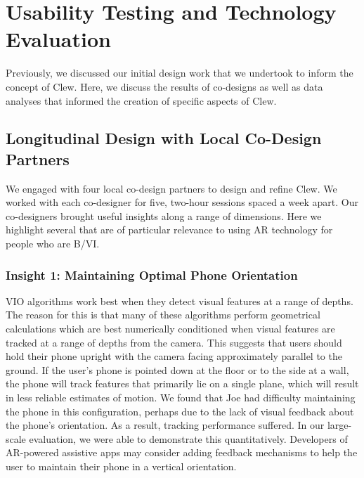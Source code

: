 \documentclass[chi_draft]{sigchi}
\newcommand{\BVI}{B/VI\xspace}
\begin{document}
\section{Usability Testing and Technology Evaluation}\label{sec:usabilityandevaluation}
Previously, we discussed our initial design work that we undertook to inform the concept of Clew.  Here, we discuss the results of co-designs as well as data analyses that informed the creation of specific aspects of Clew. %

\subsection{Longitudinal Design with Local Co-Design Partners}
We engaged with four local co-design partners to design and refine Clew.  We worked with each co-designer for five, two-hour sessions spaced a week apart.  Our co-designers brought useful insights along a range of dimensions.  Here we highlight several that are of particular relevance to using AR technology for people who are \BVI.

\subsubsection{Insight 1: Maintaining Optimal Phone Orientation}
VIO algorithms work best when they detect visual features at a range of depths.  The reason for this is that many of these algorithms perform geometrical calculations which are best numerically conditioned when visual features are tracked at a range of depths from the camera.  This suggests that users should hold their phone upright with the camera facing approximately parallel to the ground.  If the user's phone is pointed down at the floor or to the side at a wall, the phone will track features that primarily lie on a single plane, which will result in less reliable estimates of motion.  We found that Joe had difficulty maintaining the phone in this configuration, perhaps due to the lack of visual feedback about the phone's orientation.  As a result, tracking performance suffered.  In our large-scale evaluation, we were able to demonstrate this quantitatively.  Developers of AR-powered assistive apps may consider adding feedback mechanisms to help the user to maintain their phone in a vertical orientation.
\end{document}

